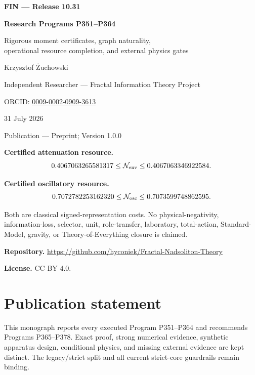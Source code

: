\documentclass[11pt,a4paper,openany]{report}
\begin{document}
\hypersetup{pageanchor=false}
\begin{titlepage}
\centering
\vspace*{7mm}
{\Large\bfseries FIN --- Release 10.31\par}
\vspace{9mm}
{\Huge\bfseries Research Programs P351--P364\par}
\vspace{6mm}
{\Large Rigorous moment certificates, graph naturality,\\
operational resource completion, and external physics gates\par}
\vspace{13mm}
{\Large Krzysztof \.Zuchowski\par}
\vspace{2mm}
{\normalsize Independent Researcher --- Fractal Information Theory Project\par}
\vspace{2mm}
{\normalsize ORCID:
\href{https://orcid.org/0009-0002-0909-3613}{0009-0002-0909-3613}\par}
\vspace{7mm}
{\large 31 July 2026\par}
{\normalsize Publication --- Preprint; Version 1.0.0\par}
\vfill
\begin{minipage}{0.92\textwidth}
\small
\textbf{Certified attenuation resource.}
\[
0.4067063265581317
\leq\mathcal N_{\rm env}
\leq0.4067063346922584.
\]

\textbf{Certified oscillatory resource.}
\[
0.7072782253162320
\leq\mathcal N_{\rm osc}
\leq0.7073599748862595.
\]

Both are classical signed-representation costs. No physical-negativity,
information-loss, selector, unit, role-transfer, laboratory, total-action,
Standard-Model, gravity, or Theory-of-Everything closure is claimed.

\medskip
\textbf{Repository.}
\url{https://github.com/hyconiek/Fractal-Nadsoliton-Theory}

\textbf{License.} CC BY 4.0.
\end{minipage}
\vfill
\end{titlepage}
\hypersetup{pageanchor=true}
\chapter*{Publication statement}
This monograph reports every executed Program P351--P364 and recommends
Programs P365--P378. Exact proof, strong numerical evidence, synthetic
apparatus design, conditional physics, and missing external evidence are
kept distinct. The legacy/strict split and all current strict-core
guardrails remain binding.
\end{document}
